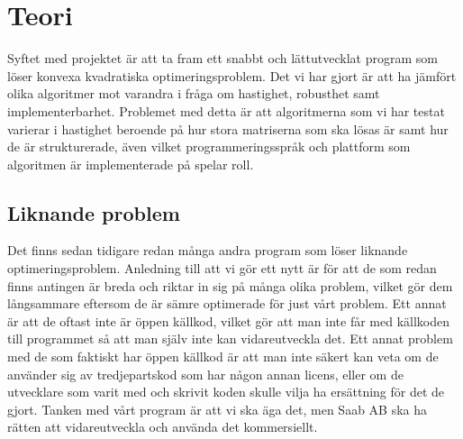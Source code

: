 \section{Teori}
Syftet med projektet är att ta fram ett snabbt och lättutvecklat program som löser konvexa kvadratiska optimeringsproblem. Det vi har gjort är att ha jämfört olika algoritmer mot varandra i fråga om hastighet, robusthet samt implementerbarhet. Problemet med detta är att algoritmerna som vi har testat varierar i hastighet beroende på hur stora matriserna som ska lösas är samt hur de är strukturerade, även vilket programmeringsspråk och plattform som algoritmen är implementerade på spelar roll.

\subsection{Liknande problem}
Det finns sedan tidigare redan många andra program som löser liknande optimeringsproblem. Anledning till att vi gör ett nytt är för att de som redan finns antingen är breda och riktar in sig på många olika problem, vilket gör dem långsammare eftersom de är sämre optimerade för just vårt problem. Ett annat är att de oftast inte är öppen källkod, vilket gör att man inte får med källkoden till programmet så att man själv inte kan vidareutveckla det. Ett annat problem med de som faktiskt har öppen källkod är att man inte säkert kan veta om de använder sig av tredjepartskod som har någon annan licens, eller om de utvecklare som varit med och skrivit koden skulle vilja ha ersättning för det de gjort.
Tanken med vårt program är att vi ska äga det, men Saab AB ska ha rätten att vidareutveckla och använda det kommersiellt.

